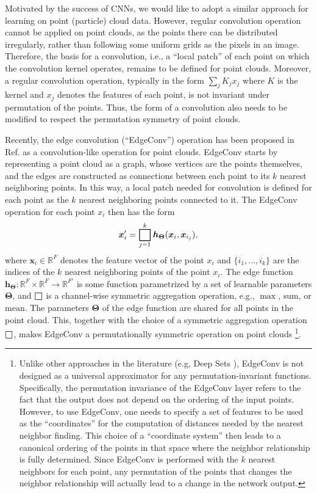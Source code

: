 \documentclass[aps,prd,longbibliography,reprint,amsmath,amssymb,amsfonts]{revtex4-1}
\begin{document}
Motivated by the success of CNNs, we would like to adopt a similar approach for learning on point (particle) cloud data. However, regular convolution operation cannot be applied on point clouds, as the points there can be distributed irregularly, rather than following some uniform grids as the pixels in an image. Therefore, the basis for a convolution, i.e., a ``local patch'' of each point on which the convolution kernel operates, remains to be defined for point clouds. Moreover, a regular convolution operation, typically in the form $\sum_{j}K_{j}x_{j}$ where $K$ is the kernel and $x_{j}$ denotes the features of each point, is not invariant under permutation of the points. Thus, the form of a convolution also needs to be modified to respect the permutation symmetry of point clouds.

Recently, the edge convolution (``EdgeConv'') operation has been proposed in Ref. \cite{DBLP:journals/corr/abs-1801-07829} as a convolution-like operation for point clouds. EdgeConv starts by representing a point cloud as a graph, whose vertices are the points themselves, and the edges are constructed as connections between each point to its $k$ nearest neighboring points. In this way, a local patch needed for convolution is defined for each point as the $k$ nearest neighboring points connected to it. The EdgeConv operation for each point $x_i$ then has the form
\begin{equation}
\bm{x}_{i}' = \mathop{\bigsquare}_{j=1}^{k} \bm{h}_{\boldsymbol{\Theta}}(\bm{x}_i, \bm{x}_{i_j}),
\label{eq:edge-conv}
\end{equation}
where $\bm{x}_i\in\mathbb{R}^F$ denotes the feature vector of the point $x_i$ and $\{i_1, ..., i_k\}$ are the indices of the $k$ nearest neighboring points of the point $x_i$. The edge function $\bm{h}_{\boldsymbol{\Theta}}: \mathbb{R}^F\times \mathbb{R}^F \rightarrow \mathbb{R}^{F'}$ is some function parametrized by a set of learnable parameters $\boldsymbol{\Theta}$, and $\MedBox$ is a channel-wise symmetric aggregation operation, e.g., $\max$, $\text{sum}$, or $\text{mean}$. The parameters $\boldsymbol{\Theta}$ of the edge function are shared for all points in the point cloud. This, together with the choice of a symmetric aggregation operation $\MedBox$, makes EdgeConv a permutationally symmetric operation on point clouds \footnote{Unlike other approaches in the literature (e.g, Deep Sets \cite{zaheer2017deep}), EdgeConv is not designed as a universal approximator for any permutation-invariant functions. Specifically, the permutation invariance of the EdgeConv layer refers to the fact that the output does not depend on the ordering of the input points. However, to use EdgeConv, one needs to specify a set of features to be used as the ``coordinates'' for the computation of distances needed by the nearest neighbor finding. This choice of a ``coordinate system'' then leads to a canonical ordering of the points in that space where the neighbor relationship is fully determined. Since EdgeConv is performed with the $k$ nearest neighbors for each point, any permutation of the points that changes the neighbor relationship will actually lead to a change in the network output.}.
\end{document}
